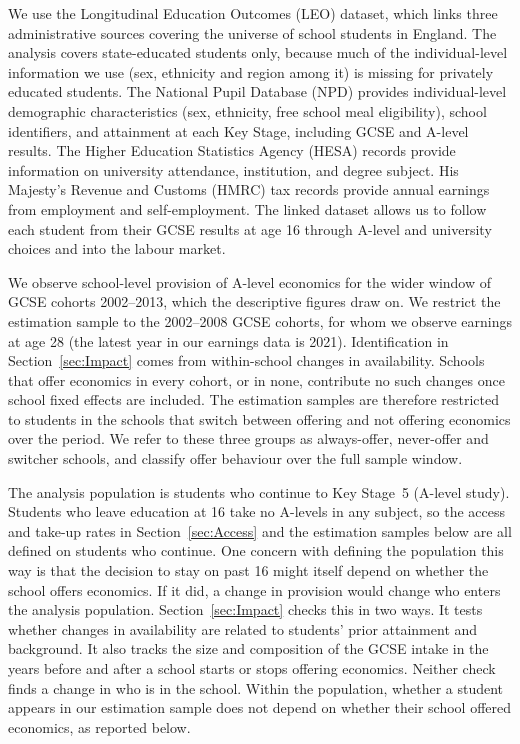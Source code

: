 We use the Longitudinal Education Outcomes (LEO) dataset, which links three administrative sources covering the universe of school students in England. The analysis covers state-educated students only, because much of the individual-level information we use (sex, ethnicity and region among it) is missing for privately educated students. The National Pupil Database (NPD) provides individual-level demographic characteristics (sex, ethnicity, free school meal eligibility), school identifiers, and attainment at each Key Stage, including GCSE and A-level results. The Higher Education Statistics Agency (HESA) records provide information on university attendance, institution, and degree subject. His Majesty's Revenue and Customs (HMRC) tax records provide annual earnings from employment and self-employment. The linked dataset allows us to follow each student from their GCSE results at age 16 through A-level and university choices and into the labour market.

We observe school-level provision of A-level economics for the wider window of GCSE cohorts 2002--2013, which the descriptive figures draw on. We restrict the estimation sample to the 2002--2008 GCSE cohorts, for whom we observe earnings at age 28 (the latest year in our earnings data is 2021). Identification in Section~\ref{sec:Impact} comes from within-school changes in availability. Schools that offer economics in every cohort, or in none, contribute no such changes once school fixed effects are included. The estimation samples are therefore restricted to students in the schools that switch between offering and not offering economics over the period. We refer to these three groups as always-offer, never-offer and switcher schools, and classify offer behaviour over the full sample window.

The analysis population is students who continue to Key Stage~5 (A-level study). Students who leave education at 16 take no A-levels in any subject, so the access and take-up rates in Section~\ref{sec:Access} and the estimation samples below are all defined on students who continue. One concern with defining the population this way is that the decision to stay on past 16 might itself depend on whether the school offers economics. If it did, a change in provision would change who enters the analysis population. Section~\ref{sec:Impact} checks this in two ways. It tests whether changes in availability are related to students' prior attainment and background. It also tracks the size and composition of the GCSE intake in the years before and after a school starts or stops offering economics. Neither check finds a change in who is in the school. Within the population, whether a student appears in our estimation sample does not depend on whether their school offered economics, as reported below.

